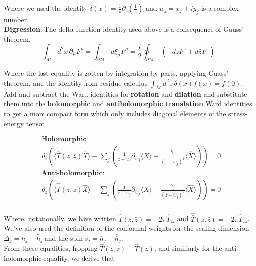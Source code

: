 \noindent Where we used the identity $\delta(x) = \frac{1}{\pi} \partial_{\bar{z}} \left( \frac{1}{z} \right)$ and $w_j = x_j + i y_j$ is a complex number. \\

\noindent \textbf{Digression}: The delta function identity used above is a consequence of Gauss' theorem. \\

\begin{equation}
\int_\mathcal{M} d^2 x \, \partial_\mu F^\mu = \int_{\partial \mathcal{M}} d \xi_\mu F^\mu = \frac{i}{2} \oint_{\partial \mathcal{M}} \, (-dz F^{\bar{z}} + d\bar{z} F^z)
\end{equation}

\noindent Where the last equality is gotten by integration by parts, applying Guass' theorem, and the identity from residue calculus $\int_{\mathcal{M}} d^2 x \, \delta (x) f (x) = f(0)$. \\

\noindent Add and subtract the Ward identities for \textbf{rotation} and \textbf{dilation} and substitute them into the \textbf{holomorphic} and \textbf{antiholomorphic translation} Ward identities to get a more compact form which only includes diagonal elements of the stress-energy tensor

\begin{align}
&\textbf{Holomorphic: } \\
& \partial_{\bar{z}} \left( \langle \hat{T} (z, \bar{z}) \hat{X} \rangle - \sum_j \left( \frac{1}{z-w_j} \partial_{w_j} \langle \hat{X} \rangle + \frac{h_j}{(z-w_j)^2} \langle \hat{X} \rangle \right) \right) = 0 \\
&\textbf{Anti-holomorphic: } \\
& \partial_z \left( \langle \hat{\bar{T}} (z, \bar{z}) \hat{X} \rangle - \sum_j \left( \frac{1}{\bar{z}-\bar{w}_j} \partial_{\bar{w}_j} \langle \hat{X} \rangle + \frac{h_j}{(\bar{z}-\bar{w}_j)^2} \langle \hat{X} \rangle \right) \right) = 0 \\
\end{align}

\noindent Where, notationally, we have written $\hat{T}(z,\bar{z}) = -2\pi \hat{T}_{zz}$ and $\hat{\bar{T}}(z,\bar{z}) = -2\pi \hat{T}_{\bar{z} \bar{z}}$. We've also used the definition of the conformal weights for the scaling dimension $\Delta_j = h_j + \bar{h}_j$ and the spin $s_j = h_j - \bar{h}_j$. \\

\noindent From these equalities, fropping $\hat{T}(z,\bar{z}) = \hat{T}(z)$, and similiarly for the anti-holomorphic equality, we derive that

